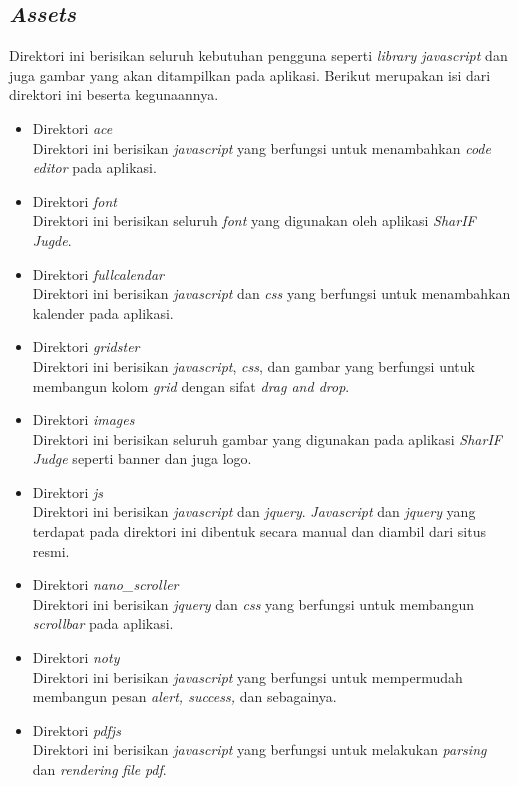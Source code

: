 \subsection{\textit{Assets}}
Direktori ini berisikan seluruh kebutuhan pengguna seperti \textit{library javascript} dan juga gambar yang akan ditampilkan pada aplikasi. Berikut merupakan isi dari direktori ini beserta kegunaannya.
\begin{itemize}
	\item Direktori \textit{ace} \\ Direktori ini berisikan \textit{javascript} yang berfungsi untuk menambahkan \textit{code editor} pada aplikasi.
	\item Direktori \textit{font} \\Direktori ini berisikan seluruh \textit{font} yang digunakan oleh aplikasi \textit{SharIF Jugde}.
	\item Direktori \textit{fullcalendar} \\Direktori ini berisikan \textit{javascript} dan \textit{css} yang berfungsi untuk menambahkan kalender pada aplikasi.
	\item Direktori \textit{gridster} \\Direktori ini berisikan \textit{javascript}, \textit{css}, dan gambar yang berfungsi untuk membangun kolom \textit{grid} dengan sifat \textit{drag and drop}.
	\item Direktori \textit{images} \\Direktori ini berisikan seluruh gambar yang digunakan pada aplikasi \textit{SharIF Judge} seperti banner dan juga logo.
	\item Direktori \textit{js} \\Direktori ini berisikan \textit{javascript} dan \textit{jquery}. \textit{Javascript} dan \textit{jquery} yang terdapat pada direktori ini dibentuk secara manual dan diambil dari situs resmi.
	\item Direktori \textit{nano\_scroller} \\Direktori ini berisikan \textit{jquery} dan \textit{css} yang berfungsi untuk membangun \textit{scrollbar} pada aplikasi.
	\item Direktori \textit{noty} \\Direktori ini berisikan \textit{javascript} yang berfungsi untuk mempermudah membangun pesan \textit{alert, success,} dan sebagainya.
	\item Direktori \textit{pdfjs} \\Direktori ini berisikan \textit{javascript} yang berfungsi untuk melakukan \textit{parsing} dan \textit{rendering} \textit{file} \textit{pdf}.

\end{itemize}
